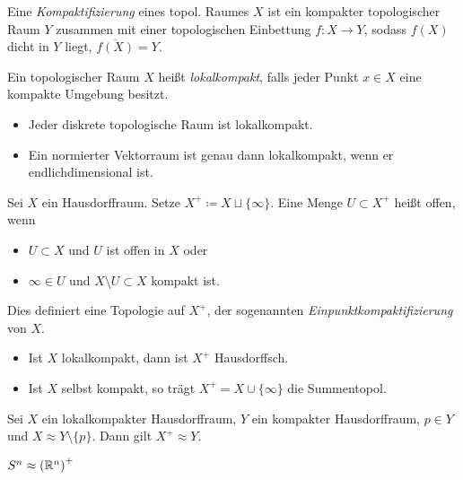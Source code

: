 \documentclass{cheat-sheet}
\begin{document}
\begin{defn}
  Eine \emph{Kompaktifizierung} eines topol. Raumes $X$ ist ein kompakter topologischer Raum $Y$ zusammen mit einer topologischen Einbettung $f : X \to Y$, sodass $f(X)$ dicht in $Y$ liegt, \dh{} $\overline{f(X)} = Y$.
\end{defn}

\begin{defn}
  Ein topologischer Raum $X$ heißt \emph{lokalkompakt}, falls jeder Punkt $x \in X$ eine kompakte Umgebung besitzt.
\end{defn}

\begin{bspe}
  \begin{itemize}
    \item Jeder diskrete topologische Raum ist lokalkompakt.
    \item Ein normierter Vektorraum ist genau dann lokalkompakt, wenn er endlichdimensional ist.
  \end{itemize}
\end{bspe}

\begin{defn}
  Sei $X$ ein Hausdorffraum. Setze $X^+ \coloneqq X \sqcup \{ \infty \}$. Eine Menge $U \subset X^+$ heißt offen, wenn
  \begin{itemize}
    \item $U \subset X$ und $U$ ist offen in $X$ oder
    \item $\infty \in U$ und $X \setminus U \subset X$ kompakt ist.
  \end{itemize}
  Dies definiert eine Topologie auf $X^+$, der sogenannten \emph{Einpunktkompaktifizierung} von $X$.
\end{defn}

\begin{bem}
  \begin{itemize}
    \item Ist $X$ lokalkompakt, dann ist $X^+$ Hausdorffsch.
    \item Ist $X$ selbst kompakt, so trägt $X^+ = X \cup \{ \infty \}$ die Summentopol.
  \end{itemize}
\end{bem}

\begin{prop}
  Sei $X$ ein lokalkompakter Hausdorffraum, $Y$ ein kompakter Hausdorffraum, $p \in Y$ und $X \approx Y \setminus \{ p \}$. Dann gilt $X^+ \approx Y$.
\end{prop}

\begin{kor}
  $S^n \approx \left(\mathbb{R}^n\right)^+$
\end{kor}
\end{document}
